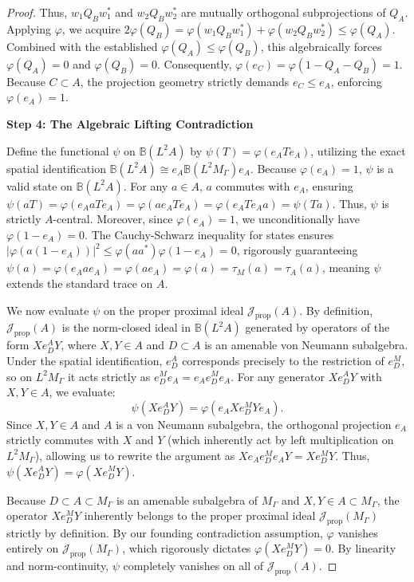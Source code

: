 \begin{proof}
Thus, $w_1 Q_B w_1^*$ and $w_2 Q_B w_2^*$ are mutually orthogonal subprojections of $Q_A$. 
Applying $\varphi$, we acquire $2 \varphi(Q_B) = \varphi(w_1 Q_B w_1^*) + \varphi(w_2 Q_B w_2^*) \le \varphi(Q_A)$. Combined with the established $\varphi(Q_A) \le \varphi(Q_B)$, this algebraically forces $\varphi(Q_A) = 0$ and $\varphi(Q_B) = 0$. 
Consequently, $\varphi(e_C) = \varphi(1 - Q_A - Q_B) = 1$. Because $C \subset A$, the projection geometry strictly demands $e_C \le e_A$, enforcing $\varphi(e_A) = 1$.

\medskip\noindent\textbf{Step 4: The Algebraic Lifting Contradiction}

Define the functional $\psi$ on $\mathbb{B}(L^2A)$ by $\psi(T) = \varphi(e_A T e_A)$, utilizing the exact spatial identification $\mathbb{B}(L^2A) \cong e_A \mathbb{B}(L^2M_\Gamma) e_A$. 
Because $\varphi(e_A) = 1$, $\psi$ is a valid state on $\mathbb{B}(L^2A)$. For any $a \in A$, $a$ commutes with $e_A$, ensuring $\psi(a T) = \varphi(e_A a T e_A) = \varphi(a e_A T e_A) = \varphi(e_A T e_A a) = \psi(T a)$. Thus, $\psi$ is strictly $A$-central. Moreover, since $\varphi(e_A) = 1$, we unconditionally have $\varphi(1 - e_A) = 0$. The Cauchy-Schwarz inequality for states ensures $|\varphi(a (1 - e_A))|^2 \le \varphi(a a^*) \varphi(1 - e_A) = 0$, rigorously guaranteeing $\psi(a) = \varphi(e_A a e_A) = \varphi(a e_A) = \varphi(a) = \tau_M(a) = \tau_A(a)$, meaning $\psi$ extends the standard trace on $A$. 

We now evaluate $\psi$ on the proper proximal ideal $\mathcal{J}_{\mathrm{prop}}(A)$. By definition, $\mathcal{J}_{\mathrm{prop}}(A)$ is the norm-closed ideal in $\mathbb{B}(L^2A)$ generated by operators of the form $X e_D^A Y$, where $X, Y \in A$ and $D \subset A$ is an amenable von Neumann subalgebra. Under the spatial identification, $e_D^A$ corresponds precisely to the restriction of $e_D^M$, so on $L^2M_\Gamma$ it acts strictly as $e_D^M e_A = e_A e_D^M e_A$. 
For any generator $X e_D^A Y$ with $X, Y \in A$, we evaluate:
\[
\psi(X e_D^A Y) = \varphi(e_A X e_D^M Y e_A).
\]
Since $X, Y \in A$ and $A$ is a von Neumann subalgebra, the orthogonal projection $e_A$ strictly commutes with $X$ and $Y$ (which inherently act by left multiplication on $L^2M_\Gamma$), allowing us to rewrite the argument as $X e_A e_D^M e_A Y = X e_D^M Y$. 
Thus, $\psi(X e_D^A Y) = \varphi(X e_D^M Y)$.

Because $D \subset A \subset M_\Gamma$ is an amenable subalgebra of $M_\Gamma$ and $X, Y \in A \subset M_\Gamma$, the operator $X e_D^M Y$ inherently belongs to the proper proximal ideal $\mathcal{J}_{\mathrm{prop}}(M_\Gamma)$ strictly by definition. 
By our founding contradiction assumption, $\varphi$ vanishes entirely on $\mathcal{J}_{\mathrm{prop}}(M_\Gamma)$, which rigorously dictates $\varphi(X e_D^M Y) = 0$. 
By linearity and norm-continuity, $\psi$ completely vanishes on all of $\mathcal{J}_{\mathrm{prop}}(A)$.


\end{proof}
